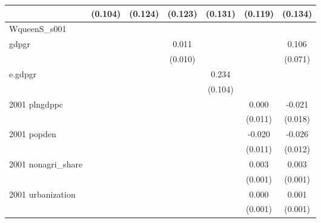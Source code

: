 \begin{table}[htbp]
\begin{tabular}{l*{6}{c}}
                    &     (0.104)         &     (0.124)         &     (0.123)         &     (0.131)         &     (0.119)         &     (0.134)         \\
\hline
WqueenS\_s001        &                     &                     &                     &                     &                     &                     \\
gdpgr               &                     &                     &       0.011         &                     &                     &       0.106         \\
                    &                     &                     &     (0.010)         &                     &                     &     (0.071)         \\
e.gdpgr             &                     &                     &                     &       0.234\sym{**} &                     &                     \\
                    &                     &                     &                     &     (0.104)         &                     &                     \\
2001 plngdppc       &                     &                     &                     &                     &       0.000         &      -0.021         \\
                    &                     &                     &                     &                     &     (0.011)         &     (0.018)         \\
2001 popden         &                     &                     &                     &                     &      -0.020\sym{*}  &      -0.026\sym{**} \\
                    &                     &                     &                     &                     &     (0.011)         &     (0.012)         \\
2001 nonagri\_share  &                     &                     &                     &                     &       0.003\sym{***}&       0.003\sym{***}\\
                    &                     &                     &                     &                     &     (0.001)         &     (0.001)         \\
2001 urbanization   &                     &                     &                     &                     &       0.000         &       0.001         \\
                    &                     &                     &                     &                     &     (0.001)         &     (0.001)         \\

\end{tabular}
\end{table}
